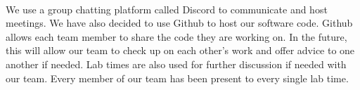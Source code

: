         \paragraph{}
        We use a group chatting platform called Discord to communicate and host meetings. We have also decided to use Github to host our software code. Github allows each team member to share the code they are working on. In the future, this will allow our team to check up on each other’s work and offer advice to one another if needed. Lab times are also used for further discussion if needed with our team. Every member of our team has been present to every single lab time.
